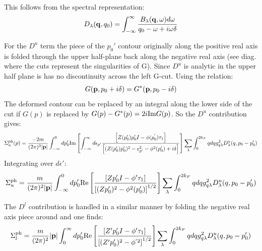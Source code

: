 This follows from the spectral representation:
\begin{equation}
D_{\lambda}({\bf q},q_{0}) = \int_{-\infty}^{\infty} \frac{B_{\lambda}({\bf q},\omega)d\omega}{q_{0} - \omega + i\omega\delta}
\end{equation}


For the $D^{u}$ term the piece of the $p_{0}'$ contour originally along the positive real axis is folded
through the upper half-plane back along the negative real axis (see diag. where the cuts represent the singularities
of G). Since $D^{u}$ is analytic in the upper half plane is has no discontinuity across the left G-cut. 
Using the relation:
%
\begin{equation}
G({\bf p}, p_{0} + i\delta) = G^{*}({\bf p}, p_{0}-i\delta)
\end{equation}
%
The deformed contour can be replaced by an integral along the lower side of the 
cut if $G(p)$ is replaced by $G(p)-G^{*}(p) = 2i {\rm Im} G(p)$. So the $D^{u}$
contribution gives:
%
\begin{equation}
\Sigma_{u}^{\rm ph}(p) = \frac{-2m}{(2\pi)^{3}|{\bf p}|}\int_{-\infty}^{0} d p'_{0} 
{\rm Im}\left[ \int_{-\infty}^{\infty}d \epsilon_{p'}\frac{\left[Z(p_{0}')p'_{0}I - \phi(p^{'}_{0})\tau_{1} \right]}
{\left[(Z(p_{0}')p_{0}')^{2} - \epsilon_{p'}^{2} - \phi^{2}(p_{0}') + i\delta \right]}\right]
\sum_{\lambda}\int_{0}^{2k_{F}}q dq g^{2}_{q\lambda} D^{u}_{\lambda}(q,p_{0} - p_{0}')
\end{equation}
%
Integrating over $d\epsilon'$:
%
\begin{equation}
\Sigma_{u}^{\rm ph} = \frac{m}{(2\pi)^{2}|{\bf p}|}\int_{-\infty}^{0} d p'_{0} 
{\rm Re}\left[\frac{\left[ Zp'_{0}I - \phi'\tau_{1} \right]}
{\left[(Zp_{0}')^{2}-\phi^{2}(p_{0}')\right] ^{1/2}}\right]
\sum_{\lambda}\int_{0}^{2k_{F}}q dq g^{2}_{q\lambda} D^{u}_{\lambda}(q,p_{0} - p_{0}')
\end{equation}
%

The $D^{l}$ contribution is handled in a similar manner by folding the negative real axis
piece around and one finds:
%
\begin{equation}
\Sigma_{l}^{\rm ph} = \frac{m}{(2\pi)^{2}}|{\bf p}|\int_{0}^{\infty}dp'_{0} 
{\rm Re}\left[\frac{\left[ Z'p'_{0}I - \phi'\tau_{1} \right]}
{\left[(Z'p_{0}')^{2}-\phi^{'2}\right]^{1/2}}\right]
\sum_{\lambda}\int_{0}^{2k_{F}}q dq g^{2}_{q\lambda} D^{u}_{\lambda}(q,p_{0} - p_{0}')
\end{equation}
%

